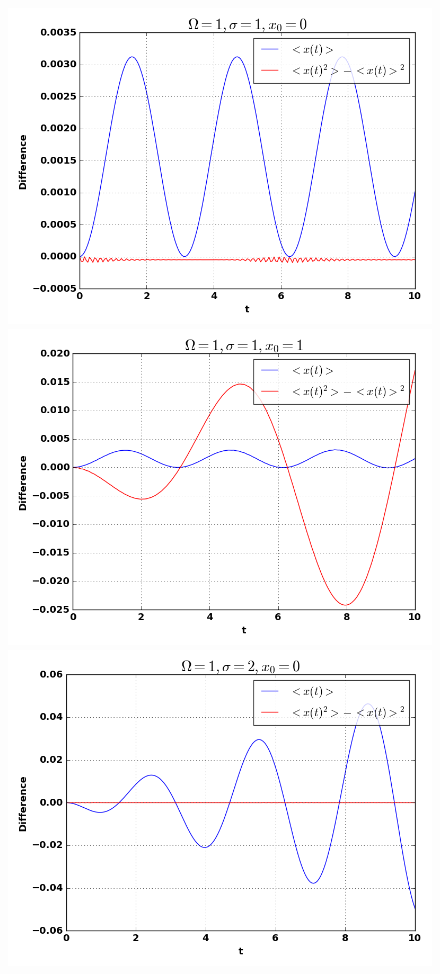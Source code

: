 \documentclass[12pt,a4paper]{article}
\begin{document}
\begin{figure}
\centering
\includegraphics[scale=0.4]{Bilder/110_dif.png}
\includegraphics[scale=0.4]{Bilder/111_dif.png}
\includegraphics[scale=0.4]{Bilder/120_dif.png}

\end{figure}
\end{document}
